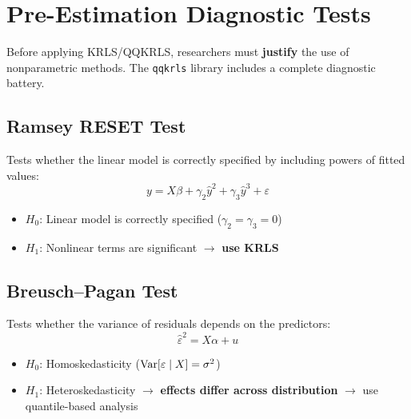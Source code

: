 
\section{Pre-Estimation Diagnostic Tests}

Before applying KRLS/QQKRLS, researchers must \textbf{justify} the use of nonparametric methods. The \texttt{qqkrls} library includes a complete diagnostic battery.

\subsection{Ramsey RESET Test}

\begin{definitionbox}
Tests whether the linear model is correctly specified by including powers of fitted values:
\begin{equation}
y = X\beta + \gamma_2 \hat{y}^2 + \gamma_3 \hat{y}^3 + \varepsilon
\end{equation}
\begin{itemize}[leftmargin=1.5em]
\item $H_0$: Linear model is correctly specified ($\gamma_2 = \gamma_3 = 0$)
\item $H_1$: Nonlinear terms are significant $\to$ \textbf{use KRLS}
\end{itemize}
\end{definitionbox}

\subsection{Breusch--Pagan Test}

\begin{definitionbox}
Tests whether the variance of residuals depends on the predictors:
\begin{equation}
\hat{\varepsilon}^2 = X\alpha + u
\end{equation}
\begin{itemize}[leftmargin=1.5em]
\item $H_0$: Homoskedasticity ($\operatorname{Var}[\varepsilon \mid X] = \sigma^2$)
\item $H_1$: Heteroskedasticity $\to$ \textbf{effects differ across distribution} $\to$ use quantile-based analysis
\end{itemize}
\end{definitionbox}

